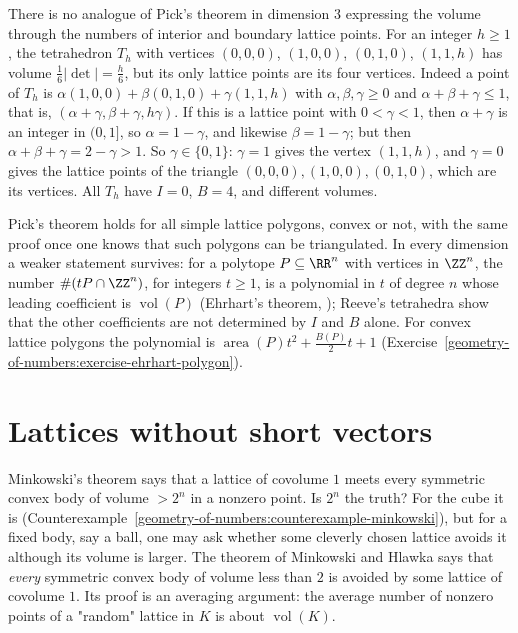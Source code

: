 \begin{counterexample}\label{geometry-of-numbers:counterexample-reeve}
There is no analogue of Pick's theorem in dimension $3$ expressing the volume through the numbers of interior and boundary lattice points. For an integer $h \geq 1$, the tetrahedron $T_h$ with vertices
$(0, 0, 0)$, $(1, 0, 0)$, $(0, 1, 0)$, $(1, 1, h)$ has volume $\frac16|\det| = \frac h6$, but its only lattice points are its four vertices. Indeed a point of $T_h$ is $\alpha(1, 0, 0) + \beta(0, 1, 0) + \gamma(1, 1, h)$
with $\alpha, \beta, \gamma \geq 0$ and $\alpha + \beta + \gamma \leq 1$, that is, $(\alpha + \gamma, \beta + \gamma, h\gamma)$. If this is a lattice point with $0 < \gamma < 1$, then $\alpha + \gamma$ is an integer in
$(0, 1]$, so $\alpha = 1 - \gamma$, and likewise $\beta = 1 - \gamma$; but then $\alpha + \beta + \gamma = 2 - \gamma > 1$. So $\gamma \in \{0, 1\}$: $\gamma = 1$ gives the vertex $(1, 1, h)$, and $\gamma = 0$ gives
the lattice points of the triangle $(0,0,0), (1,0,0), (0,1,0)$, which are its vertices. All $T_h$ have $I = 0$, $B = 4$, and different volumes.
\end{counterexample}

\begin{remark}\label{geometry-of-numbers:remark-ehrhart}
Pick's theorem holds for all simple lattice polygons, convex or not, with the same proof once one knows that such polygons can be triangulated. In every dimension a weaker statement survives: for a
polytope $P \subseteq \RR^n$ with vertices in $\ZZ^n$, the number $\#(tP \cap \ZZ^n)$, for integers $t \geq 1$, is a polynomial in $t$ of degree $n$ whose leading coefficient is $\operatorname{vol}(P)$
(Ehrhart's theorem, \cite{beck-robins}); Reeve's tetrahedra show that the other coefficients are not determined by $I$ and $B$ alone. For convex lattice polygons the polynomial is
$\operatorname{area}(P)t^2 + \frac{B(P)}{2}t + 1$ (Exercise~\ref{geometry-of-numbers:exercise-ehrhart-polygon}).
\end{remark}

\section{Lattices without short vectors}\label{geometry-of-numbers:section-existence}

Minkowski's theorem says that a lattice of covolume $1$ meets every symmetric convex body of volume $> 2^n$ in a nonzero point. Is $2^n$ the truth? For the cube it is
(Counterexample~\ref{geometry-of-numbers:counterexample-minkowski}), but for a fixed body, say a ball, one may ask whether some cleverly chosen lattice avoids it although its volume is larger. The
theorem of Minkowski and Hlawka says that \emph{every} symmetric convex body of volume less than $2$ is avoided by some lattice of covolume $1$. Its proof is an averaging argument: the average number of
nonzero points of a "random" lattice in $K$ is about $\operatorname{vol}(K)$.

